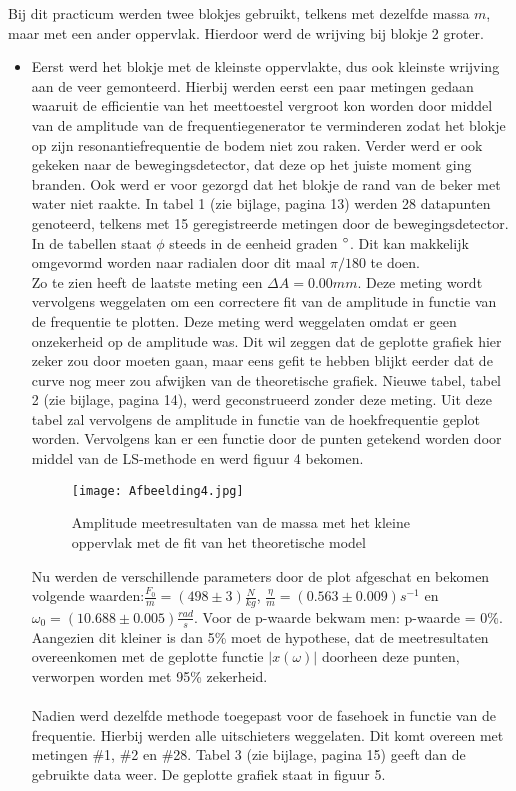 \documentclass[12pt,a4]{article}
\begin{document}
Bij dit practicum werden twee blokjes gebruikt, telkens met dezelfde massa $m$, maar met een ander oppervlak. Hierdoor werd de wrijving bij blokje 2 groter.\\
\begin{itemize}
\item Eerst werd het blokje met de kleinste oppervlakte, dus ook kleinste wrijving aan de veer gemonteerd. Hierbij werden eerst een paar metingen gedaan waaruit de efficientie van het meettoestel vergroot kon worden door middel van de amplitude van de frequentiegenerator te verminderen zodat het blokje op zijn resonantiefrequentie de bodem niet zou raken. Verder werd er ook gekeken naar de bewegingsdetector, dat deze op het juiste moment ging branden. Ook werd er voor gezorgd dat het blokje de rand van de beker met water niet raakte. In tabel 1 (zie bijlage, pagina 13) werden 28 datapunten genoteerd, telkens met 15 geregistreerde metingen door de bewegingsdetector. In de tabellen staat $\phi$ steeds in de eenheid graden $\degree$. Dit kan makkelijk omgevormd worden naar radialen door dit maal $\pi/180$ te doen. \\ 

Zo te zien heeft de laatste meting een $\Delta A = 0.00mm$. Deze meting wordt vervolgens weggelaten om een correctere fit van de amplitude in functie van de frequentie te plotten. Deze meting werd weggelaten omdat er geen onzekerheid op de amplitude was. Dit wil zeggen dat de geplotte grafiek hier zeker zou door moeten gaan, maar eens gefit te hebben blijkt eerder dat de curve nog meer zou afwijken van de theoretische grafiek. Nieuwe tabel, tabel 2 (zie bijlage, pagina 14), werd geconstrueerd zonder deze meting. Uit deze tabel zal vervolgens de amplitude in functie van de hoekfrequentie geplot worden. Vervolgens kan er een functie door de punten getekend worden door middel van de LS-methode en werd figuur 4 bekomen. \\

\begin{figure}[h]
\centering
\texttt{[image: Afbeelding4.jpg]}
\caption{Amplitude meetresultaten van de massa met het kleine oppervlak met de fit van het theoretische model}
\end{figure}

Nu werden de verschillende parameters door de plot afgeschat en bekomen volgende waarden:$\frac{F_0}{m} = (498 \pm 3)\frac{N}{kg}$,
$\frac{\eta}{m} = (0.563 \pm 0.009)s^{-1}$ en
$\omega_0 = (10.688 \pm 0.005)\frac{rad}{s}$. Voor de p-waarde bekwam men: p-waarde = 0\%. Aangezien dit kleiner is dan 5\% moet de hypothese, dat de meetresultaten overeenkomen met de geplotte functie $|x(\omega)|$ doorheen deze punten, verworpen worden met 95\% zekerheid.\\ \\
Nadien werd dezelfde methode toegepast voor de fasehoek in functie van de frequentie. Hierbij werden alle uitschieters weggelaten. Dit komt overeen met metingen \#1, \#2 en \#28. Tabel 3 (zie bijlage, pagina 15) geeft dan de gebruikte data weer. De geplotte grafiek staat in figuur 5.


\end{itemize}
\end{document}
